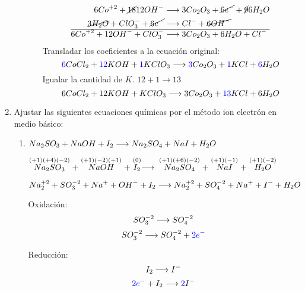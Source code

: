 \documentclass[../practica.root.tex]{subfiles}
\begin{document}
\begin{enumerate}
\begin{enumerate}
\begin{itemize}
                              \begin{align*}
                                  6 Co^{+2} + \cancel{18}{12} OH^-           & \longrightarrow{}  3 Co_2O_3 + \cancel{6 e^-} + \cancel{9}{6} H_2O \\
                                  \cancel{3 H_2O} + ClO_3^- + \cancel{6 e^-} & \longrightarrow{} Cl^- + \cancel{6 OH^-}                           \\
                                  \hline
                                  6 Co^{+2} + 12 OH^- + ClO_3^-              & \longrightarrow{} 3 Co_2O_3 + 6 H_2O + Cl^-
                              \end{align*}
                              Transladar los coeficientes a la ecuación original: \\
                              \[ \textcolor{blue}{6} CoCl_2 + \textcolor{blue}{12} KOH + \textcolor{blue}{1} KClO_3 \longrightarrow{} \textcolor{blue}{3} Co_2O_3 + \textcolor{blue}{1} KCl + \textcolor{blue}{6} H_2O \]
                              Igualar la cantidad de $K$. $12 + 1 \rightarrow 13$ \\
                              \[ 6 CoCl_2 + 12 KOH + KClO_3 \longrightarrow{} 3 Co_2O_3 + \textcolor{blue}{13} KCl + 6 H_2O \]
                    \end{itemize}
          \end{enumerate}

    \item Ajustar las siguientes ecuaciones químicas por el método ion electrón en medio básico:
          \begin{enumerate}
              \item $Na_2SO_3 + NaOH + I_2 \longrightarrow{} Na_2SO_4 + NaI + H_2O$

                    $\stackrel{(+1)(+4)(-2)}{Na_2SO_3} + \stackrel{(+1)(-2)(+1)}{NaOH} + \stackrel{(0)}{I_2}
                        \longrightarrow{} \stackrel{(+1)(+6)(-2)}{Na_2SO_4} + \stackrel{(+1)(-1)}{NaI} + \stackrel{(+1)(-2)}{H_2O}$

                    \[ Na_2^{+2} + SO_3^{-2} + Na^+ + OH^- + I_2 \longrightarrow{} Na_2^{+2} + SO_4^{-2} + Na^+ + I^- + H_2O \]

                    \begin{multicols}{2}
                        Oxidación:
                        \[ SO_3^{-2} \longrightarrow{} SO_4^{-2} \]
                        \[ SO_3^{-2} \longrightarrow{} SO_4^{-2} + \textcolor{blue}{2e^-} \]

                        \columnbreak

                        Reducción:
                        \[ I_2 \longrightarrow{} I^- \]
                        \[ \textcolor{blue}{2e^-} + I_2 \longrightarrow{} \textcolor{blue}{2} I^- \]
                    \end{multicols}


\end{enumerate}
\end{enumerate}
\end{document}
